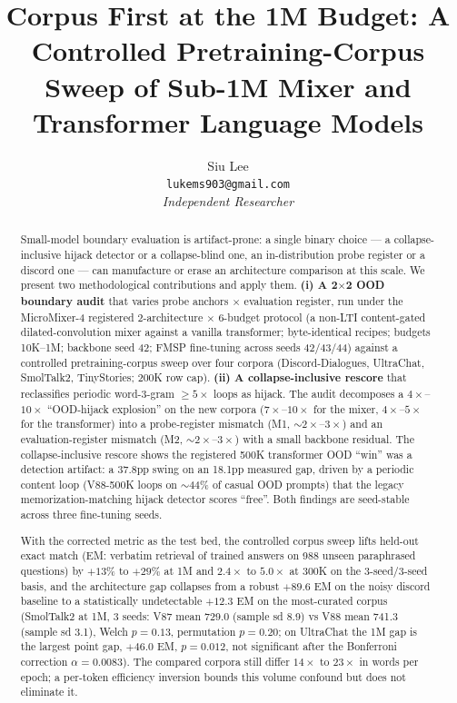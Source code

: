 \documentclass[11pt]{article}
\title{Corpus First at the 1M Budget: A Controlled Pretraining-Corpus Sweep of Sub-1M Mixer and Transformer Language Models}
\author{Siu Lee \\ \texttt{lukems903@gmail.com} \\ \textit{Independent Researcher}}
\date{}
\begin{document}
\maketitle

\begin{abstract}
Small-model boundary evaluation is artifact-prone: a single binary choice --- a collapse-inclusive hijack detector or a collapse-blind one, an in-distribution probe register or a discord one --- can manufacture or erase an architecture comparison at this scale. We present two methodological contributions and apply them. \textbf{(i) A 2$\times$2 OOD boundary audit} that varies probe anchors $\times$ evaluation register, run under the MicroMixer-4 registered 2-architecture $\times$ 6-budget protocol (a non-LTI content-gated dilated-convolution mixer against a vanilla transformer; byte-identical recipes; budgets 10K--1M; backbone seed 42; FMSP fine-tuning across seeds 42/43/44) against a controlled pretraining-corpus sweep over four corpora (Discord-Dialogues, UltraChat, SmolTalk2, TinyStories; 200K row cap). \textbf{(ii) A collapse-inclusive rescore} that reclassifies periodic word-3-gram $\geq 5\times$ loops as hijack. The audit decomposes a $4\times$--$10\times$ ``OOD-hijack explosion'' on the new corpora ($7\times$--$10\times$ for the mixer, $4\times$--$5\times$ for the transformer) into a probe-register mismatch (M1, $\sim$$2\times$--$3\times$) and an evaluation-register mismatch (M2, $\sim$$2\times$--$3\times$) with a small backbone residual. The collapse-inclusive rescore shows the registered 500K transformer OOD ``win'' was a detection artifact: a 37.8pp swing on an 18.1pp measured gap, driven by a periodic content loop (V88-500K loops on $\sim$44\% of casual OOD prompts) that the legacy memorization-matching hijack detector scores ``free''. Both findings are seed-stable across three fine-tuning seeds.

With the corrected metric as the test bed, the controlled corpus sweep lifts held-out exact match (EM: verbatim retrieval of trained answers on 988 unseen paraphrased questions) by $+13\%$ to $+29\%$ at 1M and $2.4\times$ to $5.0\times$ at 300K on the 3-seed/3-seed basis, and the architecture gap collapses from a robust $+89.6$ EM on the noisy discord baseline to a statistically undetectable $+12.3$ EM on the most-curated corpus (SmolTalk2 at 1M, 3 seeds: V87 mean 729.0 (sample sd 8.9) vs V88 mean 741.3 (sample sd 3.1), Welch $p = 0.13$, permutation $p = 0.20$; on UltraChat the 1M gap is the largest point gap, $+46.0$ EM, $p = 0.012$, not significant after the Bonferroni correction $\alpha = 0.0083$). The compared corpora still differ $14\times$ to $23\times$ in words per epoch; a per-token efficiency inversion bounds this volume confound but does not eliminate it.


\end{abstract}
\end{document}
